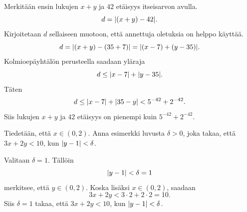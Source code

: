 \documentclass[12pt,a4paper]{article}
\begin{document}
\begin{solution}
Merkitään ensin lukujen \(x + y\) ja \(42\) etäisyys itseisarvon avulla.
\[d = \lvert(x + y) - 42\rvert.\]
Kirjoitetaan \(d\) sellaiseen muotoon, että annettuja oletuksia on helppo
käyttää.
\[d = \lvert(x + y) - (35 + 7)\rvert = \lvert(x - 7) + (y - 35)\rvert.\]
Kolmioepäyhtälön perusteella saadaan yläraja
\[d \leq \lvert x - 7\rvert + \lvert y - 35\rvert.\]
Täten
\[d \leq \lvert x - 7\rvert + \lvert35 - y\rvert < 5^{-42} + 2^{-42}.\]
Siis lukujen \(x + y\) ja \(42\) etäisyys on pienempi kuin \(5^{-42}
+ 2^{-42}\).
\end{solution}

\begin{exercise}
Tiedetään, että \(x \in (0, 2)\). Anna esimerkki luvusta \(\delta > 0\), joka
takaa, että \(3x + 2y < 10\), kun \(\lvert y - 1\rvert < \delta\).
\end{exercise}

\begin{solution}
Valitaan \(\delta = 1\). Tällöin
\[\lvert y - 1\rvert < \delta = 1\]
merkitsee, että \(y \in (0, 2)\). Koska lisäksi \(x \in (0, 2)\), saadaan
\[3x + 2y < 3 \cdot 2 + 2 \cdot 2 = 10.\]
Siis \(\delta = 1\) takaa, että \(3x + 2y < 10\), kun \(\lvert y - 1\rvert < \delta\).
\end{solution}
\end{document}
